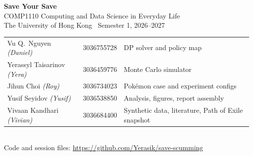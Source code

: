 \documentclass[11pt,a4paper]{article}
\begin{document}
\begin{center}
{\large\bfseries Save Your Save}\\[0.35em]
{\normalsize COMP1110 Computing and Data Science in Everyday Life}\\[0.1em]
{\normalsize The University of Hong Kong \textperiodcentered\ Semester 1, 2026--2027}\\[0.45em]
{\small
\begin{tabular}{@{}lll@{}}
Vu Q.\ Nguyen \textit{(Daniel)} & 3036755728 & DP solver and policy map \\
Yerassyl Taisarinov \textit{(Yera)} & 3036459776 & Monte Carlo simulator \\
Jihun Choi \textit{(Roy)} & 3036734023 & Pok\'emon case and experiment configs \\
Yusif Seyidov \textit{(Yusif)} & 3036538850 & Analysis, figures, report assembly \\
Vivaan Kandhari \textit{(Vivian)} & 3036684400 & Synthetic data, literature, Path of Exile snapshot \\
\end{tabular}}\\[0.45em]
{\small Code and session files: \url{https://github.com/Yerasik/save-scumming}}
\end{center}
\vspace{0.4em}

\end{document}
